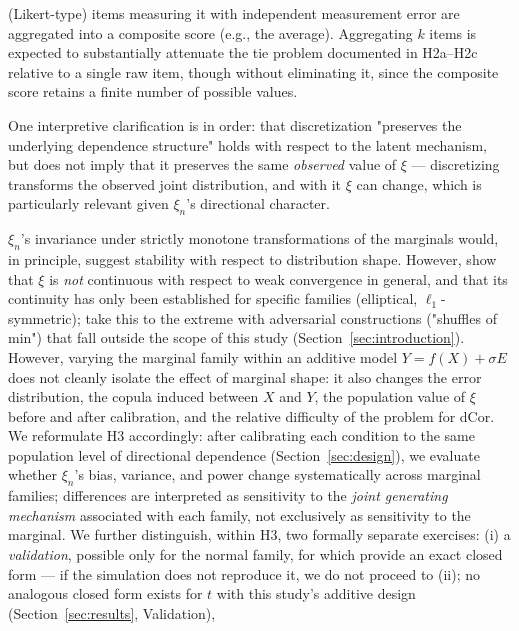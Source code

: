 \documentclass[article]{ajs}
\begin{document}
\begin{description}
\begin{description}
    (Likert-type) items measuring it with independent measurement
    error are aggregated into a composite score (e.g., the average).
    Aggregating $k$ items is expected to substantially attenuate the
    tie problem documented in H2a--H2c relative to a single raw item,
    though without eliminating it, since the composite score retains
    a finite number of possible values.
  \end{description}
  One interpretive clarification is in order: that discretization
  "preserves the underlying dependence structure" holds with respect
  to the latent mechanism, but does not imply that it preserves the
  same \emph{observed} value of $\xi$ --- discretizing transforms the
  observed joint distribution, and with it $\xi$ can change, which is
  particularly relevant given $\xi_n$'s directional character.
\item[H3 (distribution shape).] $\xi_n$'s invariance under strictly
  monotone transformations of the marginals would, in principle,
  suggest stability with respect to distribution shape. However,
  \cite{ansari2026} show that $\xi$ is \emph{not} continuous with
  respect to weak convergence in general, and that its continuity has
  only been established for specific families (elliptical,
  $\ell_1$-symmetric); \cite{bucher2025} take this to the extreme with
  adversarial constructions ("shuffles of min") that fall outside the
  scope of this study (Section~\ref{sec:introduction}). However,
  varying the marginal family within an additive model
  $Y=f(X)+\sigma E$ does not cleanly isolate the effect of marginal
  shape: it also changes the error distribution, the copula induced
  between $X$ and $Y$, the population value of $\xi$ before and after
  calibration, and the relative difficulty of the problem for dCor. We
  reformulate H3 accordingly: after calibrating each condition to the
  same population level of directional dependence
  (Section~\ref{sec:design}), we evaluate whether $\xi_n$'s bias,
  variance, and power change systematically across marginal families;
  differences are interpreted as sensitivity to the \emph{joint
  generating mechanism} associated with each family, not exclusively
  as sensitivity to the marginal. We further distinguish, within H3,
  two formally separate exercises: (i) a \emph{validation}, possible
  only for the normal family, for which \citet{ansari2026} provide an
  exact closed form --- if the simulation does not reproduce it, we do
  not proceed to (ii); no analogous closed form exists for $t$ with
  this study's additive design (Section~\ref{sec:results}, Validation),

\end{description}
\end{document}
